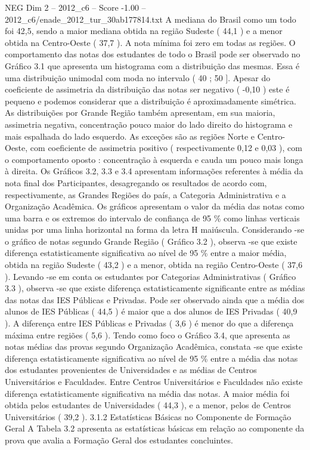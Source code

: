 \begin{textsample}{NEG Dim 2 – 2012\_c6 – Score -1.00 – 2012\_c6/enade\_2012\_tur\_30ab177814.txt}
A mediana do Brasil como um todo foi 42,5, sendo a maior mediana obtida na região Sudeste ( 44,1 ) e a menor obtida na Centro-Oeste ( 37,7 ).
A nota mínima foi zero em todas as regiões.
O comportamento das notas dos estudantes de todo o Brasil pode ser observado no Gráfico 3.1 que apresenta um histograma com a distribuição das mesmas.
Essa é uma distribuição unimodal com moda no intervalo ( 40 ; 50 ].
Apesar do coeficiente de assimetria da distribuição das notas ser negativo ( -0,10 ) este é pequeno e podemos considerar que a distribuição é aproximadamente simétrica.
As distribuições por Grande Região também apresentam, em sua maioria, assimetria negativa, concentração pouco maior do lado direito do histograma e mais espalhada do lado esquerdo.
As exceções são as regiões Norte e Centro-Oeste, com coeficiente de assimetria positivo ( respectivamente 0,12 e 0,03 ), com o comportamento oposto : concentração à esquerda e cauda um pouco mais longa à direita.
Os Gráficos 3.2, 3.3 e 3.4 apresentam informações referentes à média da nota final dos Participantes, desagregando os resultados de acordo com, respectivamente, as Grandes Regiões do país, a Categoria Administrativa e a Organização Acadêmica.
Os gráficos apresentam o valor da média das notas como uma barra e os extremos do intervalo de confiança de 95 \% como linhas verticais unidas por uma linha horizontal na forma da letra H maiúscula.
Considerando -se o gráfico de notas segundo Grande Região ( Gráfico 3.2 ), observa -se que existe diferença estatisticamente significativa ao nível de 95 \% entre a maior média, obtida na região Sudeste ( 43,2 ) e a menor, obtida na região Centro-Oeste ( 37,6 ).
Levando -se em conta os estudantes por Categorias Administrativas ( Gráfico 3.3 ), observa -se que existe diferença estatisticamente significante entre as médias das notas das IES Públicas e Privadas.
Pode ser observado ainda que a média dos alunos de IES Públicas ( 44,5 ) é maior que a dos alunos de IES Privadas ( 40,9 ).
A diferença entre IES Públicas e Privadas ( 3,6 ) é menor do que a diferença máxima entre regiões ( 5,6 ).
Tendo como foco o Gráfico 3.4, que apresenta as notas médias das provas segundo Organização Acadêmica, constata -se que existe diferença estatisticamente significativa ao nível de 95 \% entre a média das notas dos estudantes provenientes de Universidades e as médias de Centros Universitários e Faculdades.
Entre Centros Universitários e Faculdades não existe diferença estatisticamente significativa na média das notas.
A maior média foi obtida pelos estudantes de Universidades ( 44,3 ), e a menor, pelos de Centros Universitários ( 39,2 ). 3.1.2 Estatísticas Básicas no Componente de Formação Geral A Tabela 3.2 apresenta as estatísticas básicas em relação ao componente da prova que avalia a Formação Geral dos estudantes concluintes.

\end{textsample}
